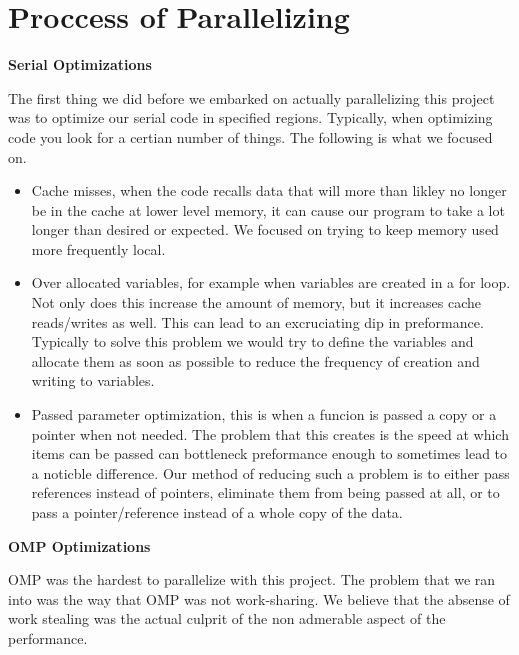 \chapter*{Proccess of Parallelizing}

\begin{center}
    \Large\textbf{Serial Optimizations}\\
\end{center}
    The first thing we did before we embarked on actually parallelizing this project was to optimize our serial code in specified regions. Typically, when optimizing code you look for a certian number of things. The following is what we focused on. 

\begin{itemize}
    \item Cache misses, when the code recalls data that will more than likley no longer be in the cache at lower level memory, it can cause our program to take a lot longer than desired or expected. We focused on trying to keep memory used more frequently local.  
    \item Over allocated variables, for example when variables are created in a for loop. Not only does this increase the amount of memory, but it increases cache reads/writes as well. This can lead to an excruciating dip in preformance. Typically to solve this problem we would try to define the variables and allocate them as soon as possible to reduce the frequency of creation and writing to variables.
    \item Passed parameter optimization, this is when a funcion is passed a copy or a pointer when not needed. The problem that this creates is the speed at which items can be passed can bottleneck preformance enough to sometimes lead to a noticble difference. Our method of reducing such a problem is to either pass references instead of pointers, eliminate them from being passed at all, or to pass a pointer/reference instead of a whole copy of the data.
\end{itemize}


\begin{center}
    \vspace{20mm}
    \Large\textbf{OMP Optimizations}\\
\end{center}

    OMP was the hardest to parallelize with this project. The problem that we ran into was the way that OMP was not work-sharing. We believe that the absense of work stealing was the actual culprit of the non admerable aspect of the performance.

